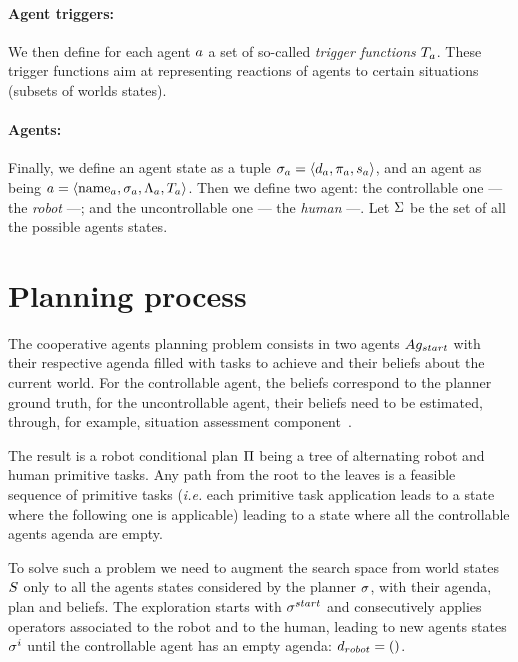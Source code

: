 \documentclass[a4paper,11pt,twoside]{StyleThese}
\begin{document}
\paragraph{\bf Agent triggers:}
We then define for each agent $a$ a set of so-called \textit{trigger functions} $T_{a}$. These trigger functions aim at representing reactions of agents to certain situations (subsets of worlds states).

\paragraph{\bf Agents:}
Finally, we define an agent state as a tuple $\sigma_{a} = \langle  d_{a}, \pi_{a}, s_{a} \rangle$, and an agent as being $a = \langle \text{name}_{a}, \sigma_{a}, \Lambda_{a}, T_{a} \rangle$. Then we define two agent: the controllable one --- the \textit{robot} ---; and the uncontrollable one --- the \textit{human} ---. Let $\Sigma$ be the set of all the possible agents states.

\section{Planning process}
The cooperative agents planning problem consists in two agents $Ag_{start}$ with their respective agenda filled with tasks to achieve and their beliefs about the current world. For the controllable agent, the beliefs correspond to the planner ground truth, for the uncontrollable agent, their beliefs need to be estimated, through, for example, situation assessment component~\cite{milliez2014framework, lemaignan2018underworlds}.

The result is a robot conditional plan $\Pi$ being a tree of alternating robot and human primitive tasks. Any path from the root to the leaves is a feasible sequence of primitive tasks (\textit{i.e.} each primitive task application leads to a state where the following one is applicable) leading to a state where all the controllable agents agenda are empty.

To solve such a problem we need to augment the search space from world states $S$ only to all the agents states considered by the planner $\sigma$, with their agenda, plan and beliefs. The exploration starts with $\sigma^{start}$ and consecutively applies operators associated to the robot and to the human, leading to new agents states $\sigma^{i}$ until the controllable agent has an empty agenda: $d_{robot} = ()$.
\end{document}
